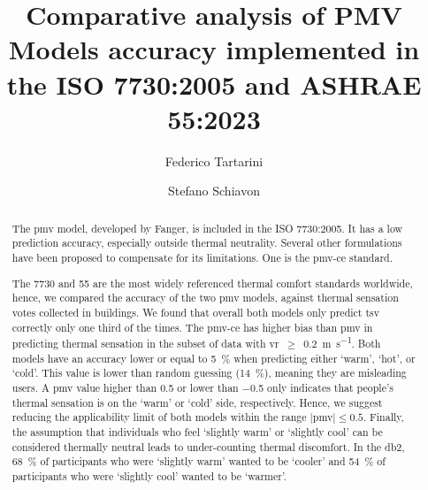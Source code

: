 \begin{frontmatter}

    \title{Comparative analysis of PMV Models accuracy implemented in the ISO 7730:2005 and ASHRAE 55:2023}

    \author[label1]{Federico Tartarini}
    \author[label3]{Stefano Schiavon}

    \address[label1]{School of Architecture, Design, and Planning, The University of Sydney, Sydney, AU}
    \address[label3]{Center for the Built Environment, Department of Architecture, Department of Civil and Environmental Engineering, University of California, Berkeley, CA, USA}


    \begin{abstract}
        The \ac{pmv} model, developed by Fanger, is included in the ISO 7730:2005.
        It has a low prediction accuracy, especially outside thermal neutrality.
        Several other formulations have been proposed to compensate for its limitations.
        One is the \ac{pmv-ce} standard.

        The \gls{7730} and \gls{55} are the most widely referenced thermal comfort standards worldwide, hence, we compared the accuracy of the two \ac{pmv} models, against  thermal sensation votes collected in buildings.
        We found that overall both models only predict \ac{tsv} correctly only one third of the times.
        The \ac{pmv-ce} has higher bias than \ac{pmv} in predicting thermal sensation in the subset of data with \acl{vr}~$\geq$~\qty{0.2}{\m\per\s}.
        Both models have an accuracy lower or equal to \qty{5}{\percent} when predicting either `warm', `hot', or `cold'.
        This value is lower than random guessing (\qty{14}{\percent}), meaning they are misleading users.
        A \ac{pmv} value higher than \num{.5} or lower than \num{-.5} only indicates that people's thermal sensation is on the `warm' or `cold' side, respectively.
        Hence, we suggest reducing the applicability limit of both models within the range $\mid$\ac{pmv}$\mid \leq 0.5$.
        Finally, the assumption that individuals who feel `slightly warm' or `slightly cool' can be considered thermally neutral leads to under-counting thermal discomfort.
        In the \acl{db2}, \qty{68}{\percent} of participants who were `slightly warm' wanted to be `cooler' and \qty{54}{\percent} of participants who were `slightly cool' wanted to be `warmer'.
    \end{abstract}


\end{frontmatter}
